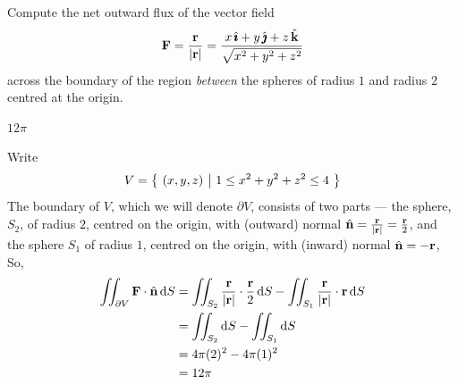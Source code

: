 \begin{question}[M317 2011A] %
Compute the net outward flux of the vector field
\begin{equation*}
\mathbf{F} = \frac{\mathbf{r}}{|\mathbf{r}|}
    = \frac{x\,\hat{\pmb{\imath}}+y\,\hat{\pmb{\jmath}}+z\,\hat{\mathbf{k}}}{\sqrt{x^2+y^2+z^2}}
\end{equation*}
across the boundary of the region \emph{between} the spheres of 
radius $1$ and radius $2$ centred at the origin.
\end{question}

%

\begin{answer} 
$12\pi$
\end{answer}

\begin{solution} 
Write
\begin{equation*}
V=\big\{ \ (x,y,z)\ \big|\  1\le x^2+y^2+z^2\le 4\ \big\}
\end{equation*}
The boundary of $V$, which we will denote $\partial V$, consists of two parts ---
the sphere, $S_2$, of radius $2$, centred on the origin,
with (outward) normal $\hat{\mathbf{n}}=\frac{\mathbf{r}}{|\mathbf{r}|}=\frac{\mathbf{r}}{2}$,
and the sphere  $S_1$ of radius $1$, centred on the origin,
with (inward) normal $\hat{\mathbf{n}} = -\mathbf{r}$, So,
\begin{align*}
\iint_{\partial V} \mathbf{F}\cdot\hat{\mathbf{n}}\,\mathrm{d}S
&=\iint_{S_2} \frac{\mathbf{r}}{|\mathbf{r}|}\cdot\frac{\mathbf{r}}{2}\,\mathrm{d}S
-\iint_{S_1} \frac{\mathbf{r}}{|\mathbf{r}|}\cdot\mathbf{r}\,\mathrm{d}S \\
&=\iint_{S_2} \mathrm{d}S
   -\iint_{S_1} \mathrm{d}S \\
&=4\pi(2)^2 -4\pi(1)^2 \\
&=12\pi
\end{align*} 
\end{solution}

